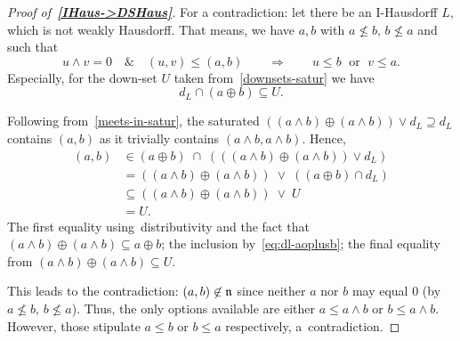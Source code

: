 \begin{proof}[Proof of~{\bf \ref{IHaus->DSHaus}}\thinspace]
  For a contradiction: let there be an I-Hausdorff $L$, which is not weakly
  Hausdorff.
  That means, we have $a, b$ with $a \not\leq b, \, b \not\leq a$ and such that
  \[
    u \wedge v = 0 \quad \& \quad \left(u, v\right) \leq \left(a, b\right)
    \qquad \Longrightarrow \qquad
    u \leq b \; \textrm{ or } \; v \leq a.
  \]
  Especially, for the down-set $U$ taken from~\ref{downsets-satur} we have
  \begin{equation} \label{eq:dl-aoplusb}
    d_L \cap (a \oplus b) \subseteq U.
  \end{equation}

  Following from~\ref{meets-in-satur}\thinspace, the saturated $(\left(a \wedge
  b\right) \oplus \left(a \wedge b\right)) \vee d_L \supseteq d_L$
  contains $(a, b)$ as it trivially contains $\left( a \wedge b, a \wedge b
  \right)$.
  Hence,
  \begin{align*}
    (a, b) &\in (a \oplus b) \; \cap \; (((a \wedge b) \oplus (a \wedge b))
            \vee d_L) \\
           &= ((a \wedge b) \oplus (a \wedge b)) \; \vee \; ((a \oplus b) \cap
               d_L) \\
           &\subseteq ((a \wedge b) \oplus (a \wedge b)) \; \vee \; U \\
           &= U.
  \end{align*}
  The first equality using~distributivity and the fact that $(a \wedge b)
  \oplus (a \wedge b) \subseteq a \oplus b$;
  the inclusion by~\ref{eq:dl-aoplusb}\thinspace;
  the final equality from $(a \wedge b) \oplus (a \wedge b) \subseteq U$.

  This leads to the contradiction:
  $(a, b)\not\in \mathfrak{n}$ since neither $a$ nor $b$ may equal $0$ (by $a \not\leq b,
  \, b \not\leq a$).
  Thus, the only options available are either $a \leq a \wedge b$ or $b \leq a
  \wedge b$.
  However, those stipulate $a \leq b$ or $b \leq a$ respectively,
  a~contradiction. 
\end{proof}
